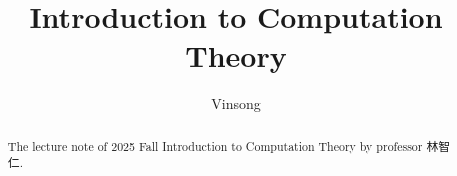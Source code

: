 \documentclass[a4paper]{report}
\author{Vinsong}
\title{Introduction to Computation Theory}
\begin{document}
\maketitle

\begin{abstract}
    The lecture note of 2025 Fall Introduction to Computation Theory by professor 林智仁.
\end{abstract}

\newpage

\tableofcontents

\setcounter{chapter}{-1}

\end{document}
